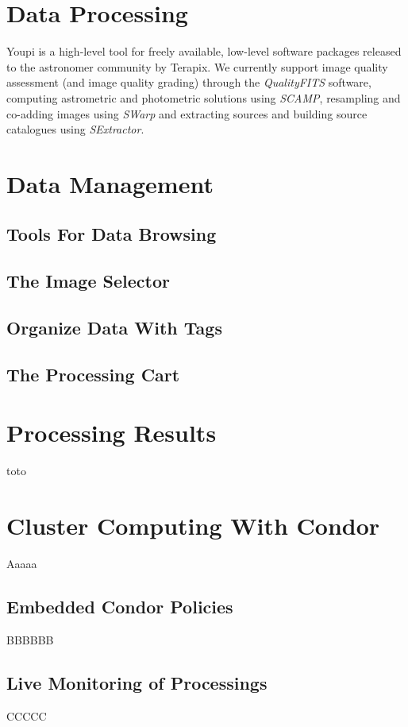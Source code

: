 \documentclass[11pt,twoside]{article}  %
\begin{document}
\section{Data Processing}

Youpi is a high-level tool for freely available, low-level software packages released 
to the astronomer community by Terapix. We currently support image quality assessment 
(and image quality grading) through the \emph{QualityFITS} software, computing astrometric 
and photometric solutions using \emph{SCAMP}, resampling and co-adding images using \emph{SWarp} 
and extracting sources and building source catalogues using \emph{SExtractor}.

\section{Data Management}
\subsection{Tools For Data Browsing}
\subsection{The Image Selector}\label{sec:ims}
\subsection{Organize Data With Tags}
\subsection{The Processing Cart}

\section{Processing Results}

toto

\section{Cluster Computing With Condor}
Aaaaa
\subsection{Embedded Condor Policies}
BBBBBB
\subsection{Live Monitoring of Processings}
CCCCC
\end{document}
